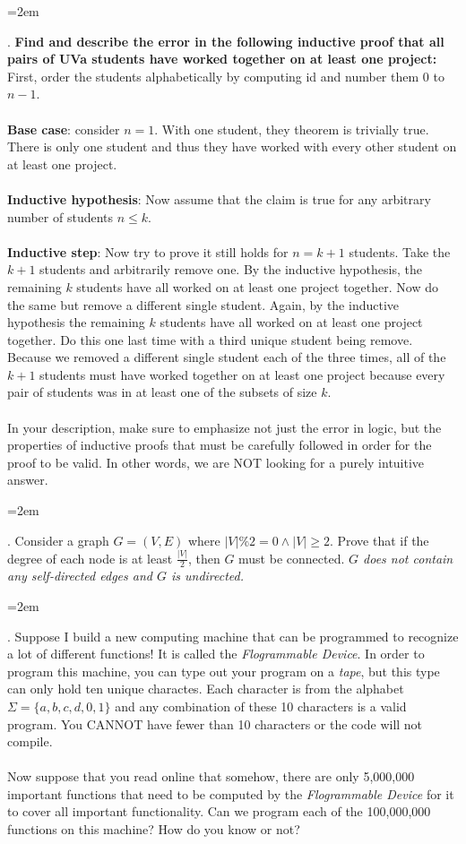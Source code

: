 \documentclass[12pt]{article}
\newcounter{quesnum}
\newcommand{\question}[2][??]{
\begin{list}{\labelitemi}{\leftmargin=2em}
\item [\arabic{quesnum}.] {} {#2}
\end{list}
\addtocounter{quesnum}{1}
}
\begin{document}
\question[3]{
\textbf{Find and describe the error in the following inductive proof that all pairs of UVa students have worked together on at least one project:} First, order the students alphabetically by computing id and number them $0$ to $n-1$.\\
\\
\textbf{Base case}: consider $n=1$. With one student, they theorem is trivially true. There is only one student and thus they have worked with every other student on at least one project.\\
\\
\textbf{Inductive hypothesis}: Now assume that the claim is true for any arbitrary number of students $n \leq k$.\\
\\
\textbf{Inductive step}: Now try to prove it still holds for $n=k+1$ students. Take the $k+1$ students and arbitrarily remove one. By the inductive hypothesis, the remaining $k$ students have all worked on at least one project together. Now do the same but remove a different single student. Again, by the inductive hypothesis the remaining $k$ students have all worked on at least one project together. Do this one last time with a third unique student being remove. Because we removed a different single student each of the three times, all of the $k+1$ students must have worked together on at least one project because every pair of students was in at least one of the subsets of size $k$.\\
\\
In your description, make sure to emphasize not just the error in logic, but the properties of inductive proofs that must be carefully followed in order for the proof to be valid. In other words, we are NOT looking for a purely intuitive answer.}

\vspace{12pt}


\question[3]{
Consider a graph $G=(V,E)$ where $|V| \% 2 = 0 \wedge |V| \geq 2$. Prove that if the degree of each node is at least $\frac{|V|}{2}$, then $G$ must be connected. \emph{$G$ does not contain any self-directed edges and $G$ is undirected.}
}

\vspace{12pt}




\question[3]{
Suppose I build a new computing machine that can be programmed to recognize a lot of different functions! It is called the \emph{Flogrammable Device}. In order to program this machine, you can type out your program on a \emph{tape}, but this type can only hold ten unique charactes. Each character is from the alphabet $\Sigma=\{a,b,c,d,0,1\}$ and any combination of these 10 characters is a valid program. You CANNOT have fewer than 10 characters or the code will not compile.\\
\\
Now suppose that you read online that somehow, there are only 5,000,000 important functions that need to be computed by the \emph{Flogrammable Device} for it to cover all important functionality. Can we program each of the 100,000,000 functions on this machine? How do you know or not?
}
\end{document}
